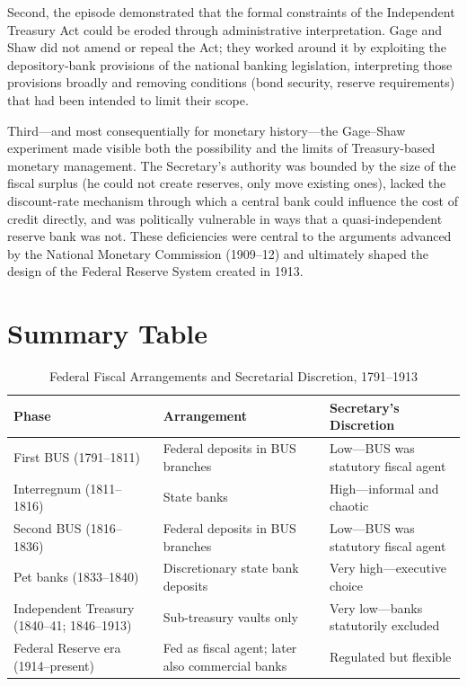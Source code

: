 \documentclass[12pt]{article}
\begin{document}
Second, the episode demonstrated that the formal constraints of the
Independent Treasury Act could be eroded through administrative
interpretation.  Gage and Shaw did not amend or repeal the Act; they
worked around it by exploiting the depository-bank provisions of the
national banking legislation, interpreting those provisions broadly and
removing conditions (bond security, reserve requirements) that had been
intended to limit their scope.

Third---and most consequentially for monetary history---the Gage--Shaw
experiment made visible both the possibility and the limits of
Treasury-based monetary management.  The Secretary's authority was
bounded by the size of the fiscal surplus (he could not create
reserves, only move existing ones), lacked the discount-rate mechanism
through which a central bank could influence the cost of credit
directly, and was politically vulnerable in ways that a quasi-independent
reserve bank was not.  These deficiencies were central to the arguments
advanced by the National Monetary Commission (1909--12) and ultimately
shaped the design of the Federal Reserve System created in 1913.

\section{Summary Table}

\begin{table}[ht]
\centering
\caption{Federal Fiscal Arrangements and Secretarial Discretion, 1791--1913}
\label{tab:fiscal_arrangements}
\renewcommand{\arraystretch}{1.4}
\begin{tabular}{>{\raggedright}p{3.2cm}
                >{\raggedright}p{4.8cm}
                >{\raggedright\arraybackslash}p{4.8cm}}
\toprule
\textbf{Phase} & \textbf{Arrangement} & \textbf{Secretary's Discretion} \\
\midrule
First BUS (1791--1811)
  & Federal deposits in BUS branches
  & Low---BUS was statutory fiscal agent \\
Interregnum (1811--1816)
  & State banks
  & High---informal and chaotic \\
Second BUS (1816--1836)
  & Federal deposits in BUS branches
  & Low---BUS was statutory fiscal agent \\
Pet banks (1833--1840)
  & Discretionary state bank deposits
  & Very high---executive choice \\
Independent Treasury (1840--41; 1846--1913)
  & Sub-treasury vaults only
  & Very low---banks statutorily excluded \\
Federal Reserve era (1914--present)
  & Fed as fiscal agent; later also commercial banks
  & Regulated but flexible \\
\bottomrule
\end{tabular}
\end{table}
\end{document}

